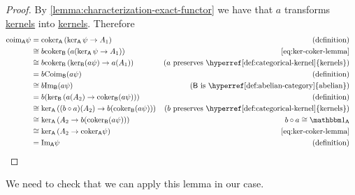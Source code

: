 \documentclass[../../main]{subfiles}
\begin{document}
\begin{proof}
  By \autoref{lemma:characterization-exact-functor} we have that \(a\) transforms \hyperref[def:categorical-kernel]{kernels} into \hyperref[def:categorical-kernel]{kernels}.
  Therefore
  \begin{align*}
    \text{coim}_{\category{A}} \psi &= \text{coker}_{\category{A}} \left( \ker_{\category{A}} \psi \to A_{1} \right)      & (\text{definition}) \\
            &\cong b\text{coker}_{\category{B}} \left( a(\ker_{\category{A}} \psi \to A_{1}) \right)  & \eqref{eq:ker-coker-lemma} \\
            &\cong b\text{coker}_{\category{B}} \left( \ker_{\category{B}}(a\psi) \to a(A_{1}) \right)  & (a\text{ preserves \hyperref[def:categorical-kernel]{kernels}}) \\
            &= b\text{Coim}_{\category{B}} (a\psi)                                & (\text{definition}) \\
            &\cong b\text{Im}_{\category{B}} (a\psi)                                  & (\category{B} \text{ is \hyperref[def:abelian-category]{abelian}}) \\
            &= b(\ker_{\category{B}} \left( a(A_{2}) \to \text{coker}_{\category{B}}(a\psi) \right) ) & (\text{definition}) \\
            &\cong \ker_{\category{A}} \left( (b \circ a)(A_{2}) \to b(\text{coker}_{\category{B}}(a\psi)) \right) & (b\text{ preserves \hyperref[def:categorical-kernel]{kernels}}) \\
            &\cong \ker_{\category{A}} \left( A_{2} \to b(\text{coker}_{\category{B}}(a\psi)) \right)   & b \circ a \cong \id_{\category{A}}\\
            &\cong \ker_{\category{A}} \left( A_{2} \to \text{coker}_{\category{A}} \psi \right)      & \eqref{eq:ker-coker-lemma} \\
            &= \text{Im}_{\category{A}} \psi                                     & (\text{definition}) & \qedhere
  \end{align*}
\end{proof}

We need to check that we can apply this lemma in our case.
\end{document}
